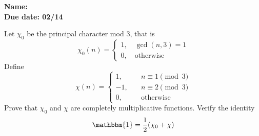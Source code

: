 \documentclass[11pt,letterpaper]{article}
\newcommand{\homework}[2]{\noindent\textbf{Name: }{} \hfill \textbf{} \\  \textbf{Due date: #2} \hfill \textbf{}\\}
\DeclareMathOperator{\1}{\mathbbm{1}}
\begin{document}
\homework{\#}{02/14}


\begin{exercise}
  Let $\chi_0$ be the principal character mod $3$, that is
  \[\chi_0 (n) = \begin{cases}
      1 , \quad \gcd(n,3)=1 \\
      0, \quad \text{otherwise}
    \end{cases}\]
  Define
  \[\chi(n) = \begin{cases}
      1, \quad  & n \equiv 1 \pmod 3 \\
      -1, \quad & n \equiv 2 \pmod 3 \\
      0, \quad  & \text{otherwise}
    \end{cases}\]
  Prove that $\chi_0$ and $\chi$ are completely multiplicative functions. Verify the identity
  \[ \mathbbm{1} = \dfrac{1}{2}(\chi_0 +\chi)\]
\end{exercise}
\end{document}
